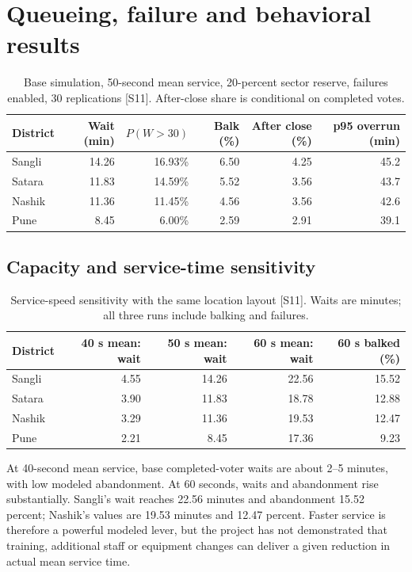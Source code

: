 \documentclass[11pt,a4paper,oneside]{report}
\begin{document}
\chapter{Queueing, failure and behavioral results}
\begin{table}[htbp]\centering
\small
\setlength{\tabcolsep}{5pt}
\caption{Base simulation, 50-second mean service, 20-percent sector reserve, failures enabled, 30 replications [S11]. After-close share is conditional on completed votes.}
\begin{tabular}{lrrrrr}
\toprule
District & Wait (min) & $P(W>30)$ & Balk (\%) & After close (\%) & p95 overrun (min)\\
\midrule
Sangli & 14.26 & 16.93\% & 6.50 & 4.25 & 45.2\\
Satara & 11.83 & 14.59\% & 5.52 & 3.56 & 43.7\\
Nashik & 11.36 & 11.45\% & 4.56 & 3.56 & 42.6\\
Pune & 8.45 & 6.00\% & 2.59 & 2.91 & 39.1\\
\bottomrule\end{tabular}
\end{table}
\section{Capacity and service-time sensitivity}
\begin{table}[htbp]\centering
\small
\setlength{\tabcolsep}{5pt}
\caption{Service-speed sensitivity with the same location layout [S11]. Waits are minutes; all three runs include balking and failures.}
\begin{tabular}{lrrrr}
\toprule
District & 40 s mean: wait & 50 s mean: wait & 60 s mean: wait & 60 s balked (\%)\\
\midrule
Sangli & 4.55 & 14.26 & 22.56 & 15.52\\
Satara & 3.90 & 11.83 & 18.78 & 12.88\\
Nashik & 3.29 & 11.36 & 19.53 & 12.47\\
Pune & 2.21 & 8.45 & 17.36 & 9.23\\
\bottomrule\end{tabular}
\end{table}
At 40-second mean service, base completed-voter waits are about 2--5 minutes, with low modeled abandonment. At 60 seconds, waits and abandonment rise substantially. Sangli's wait reaches 22.56 minutes and abandonment 15.52 percent; Nashik's values are 19.53 minutes and 12.47 percent. Faster service is therefore a powerful modeled lever, but the project has not demonstrated that training, additional staff or equipment changes can deliver a given reduction in actual mean service time.
\end{document}
